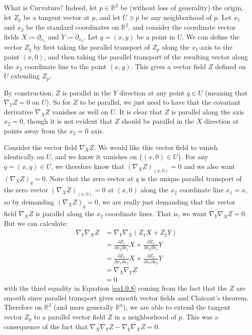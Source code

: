 \documentclass{article}
\numberwithin{equation}{subsection}
\theoremstyle{definition}
\begin{document}
\begin{section}{What is Curvature?}
Indeed, let $p\in\mathbb{R}^2$ be (without loss of generality) the origin, let $Z_p$ be a tangent vector at $p$, and let $U\ni p$ be any neighborhood of $p$. Let $x_1$ and $x_2$ be the standard coordinates on $\mathbb{R}^2$, and consider the coordinate vector fields $X\coloneqq\partial_{x_1}$ and $Y\coloneqq\partial_{x_2}$. Let $q=(x,y)$ be a point in $U$. We can define the vector $Z_q$ by first taking the parallel transport of $Z_p$ along the $x_1$-axis to the point $(x,0)$, and then taking the parallel transport of the resulting vector along the $x_2$ coordinate line to the point $(x,y)$. This gives a vector field $Z$ defined on $U$ extending $Z_p$.

By construction, $Z$ is parallel in the $Y$ direction at any point $q\in U$ (meaning that $\nabla_{Y}Z=0$ on $U$). So for $Z$ to be parallel, we just need to have that the covariant derivative $\nabla_{X}Z$ vanishes as well on $U$. It is clear that $Z$ is parallel along the axis $x_2=0$, though it is not evident that $Z$ should be parallel in the $X$ direction at points away from the $x_2=0$ axis.

Consider the vector field $\nabla_XZ$. We would like this vector field to vanish identically on $U$, and we know it vanishes on $\{(x,0)\in U\}$. For any $q=(x,y)\in U$, we therefore know that $(\nabla_XZ)_{(x,0)}=0$ and we also want $(\nabla_XZ)_q=0$. Note that the zero vector at $q$ is the unique parallel transport of the zero vector $(\nabla_XZ)_{(x,0)}=0$ at $(x,0)$ along the $x_2$ coordinate line $x_1=x$, so by demanding $(\nabla_XZ)_q=0$, we are really just demanding that the vector field $\nabla_XZ$ is parallel along the $x_2$ coordinate lines. That is, we want $\nabla_Y\nabla_XZ=0$. But we can calculate:
\begin{equation}\label{eq1.0.8}
\begin{split}
\nabla_Y\nabla_XZ&=\nabla_Y\nabla_X(Z_1X+Z_2Y)\\
&=\frac{\partial Z_1}{\partial x_2\partial x_1}X+\frac{\partial Z_2}{\partial x_2\partial x_1}Y\\
&=\frac{\partial Z_1}{\partial x_1\partial x_2}X+\frac{\partial Z_2}{\partial x_1\partial x_2}Y\\
&=\nabla_X\nabla_YZ\\
&=0
\end{split}
\end{equation}
with the third equality in Equation \ref{eq1.0.8} coming from the fact that the $Z$ are smooth since parallel transport gives smooth vector fields and Clairaut's theorem. Therefore on $\mathbb{R}^2$ (and more generally $\mathbb{R}^n$), we are able to extend the tangent vector $Z_p$ to a parallel vector field $Z$ in a neighborhood of $p$. This was a consequence of the fact that $\nabla_X\nabla_YZ-\nabla_Y\nabla_XZ=0$.


\end{section}
\end{document}
